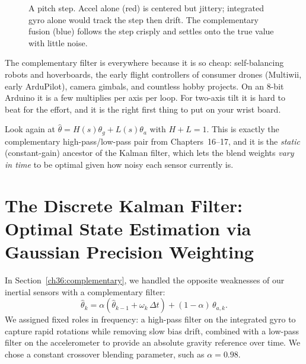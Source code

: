 \begin{figure}[H]
\centering
{}
\caption{A pitch step. Accel alone (red) is centered but jittery; integrated gyro alone
would track the step then drift. The complementary fusion (blue) follows the step
crisply and settles onto the true value with little noise.}
\label{ch36:fig-comp}
\end{figure}

\begin{applicationbox}
The complementary filter is everywhere because it is so cheap: self-balancing robots and
hoverboards, the early flight controllers of consumer drones (Multiwii, early
ArduPilot), camera gimbals, and countless hobby projects. On an 8-bit Arduino it is a
few multiplies per axis per loop. For two-axis tilt it is hard to beat for the
effort, and it is the right first thing to put on your wrist board.
\end{applicationbox}

\begin{connectionbox}
Look again at $\hat\theta = H(s)\theta_g + L(s)\theta_a$ with $H+L=1$. This is exactly
the complementary high-pass/low-pass pair from Chapters~16--17, and it is the
\emph{static} (constant-gain) ancestor of the Kalman filter, which lets the blend weights
\emph{vary in time} to be optimal given how noisy each sensor currently is.
\end{connectionbox}

\section{The Discrete Kalman Filter: Optimal State Estimation via Gaussian Precision Weighting}
\label{ch36:kalman}

In Section~\ref{ch36:complementary}, we handled the opposite weaknesses of our inertial sensors with a complementary filter:
\[
  \hat\theta_k = \alpha(\hat\theta_{k-1} + \omega_k\,\Delta t) + (1-\alpha)\,\theta_{a,k} .
\]
We assigned fixed roles in frequency: a high-pass filter on the integrated gyro to capture rapid rotations while removing slow bias drift, combined with a low-pass filter on the accelerometer to provide an absolute gravity reference over time. We chose a constant crossover blending parameter, such as $\alpha = 0.98$.

